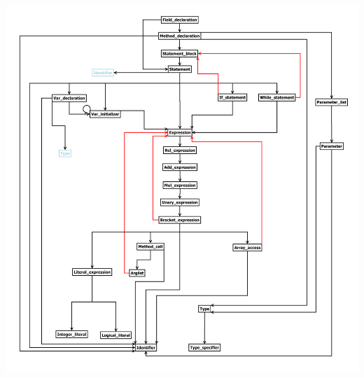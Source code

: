 \documentclass[10pt,a4paper,titlepage]{article}
\begin{document}
\includegraphics[scale=0.73]{images/Grammar.pdf}
\end{document}
